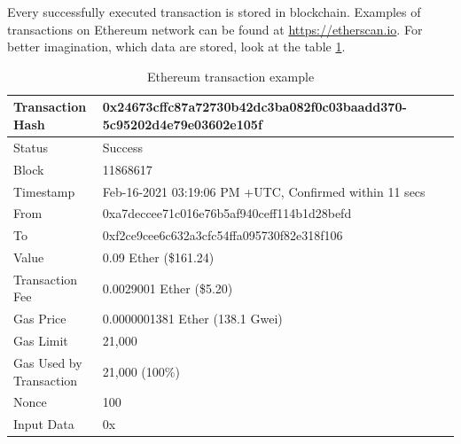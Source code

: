 \documentclass[thesis=M,english]{FITthesis}[2019/12/23]
\begin{document}
Every successfully executed transaction is stored in blockchain. Examples of transactions on Ethereum network can be found at \url{https://etherscan.io}. For better imagination, which data are stored, look at the table \ref{etherscanTransactionTable}.

\begin{table}[ht!]
\caption{Ethereum transaction example \cite{etherscanTransaction} }  \label{EthTransactionExample}
\label{etherscanTransactionTable}
\begin{tabular}{| p{0.2\linewidth} | p{0.8\linewidth} |}
\hline
Transaction Hash        & 0x24673cffc87a72730b42dc3ba082f0c03baadd370- 5c95202d4e79e03602e105f \\\hline
Status                  & Success                                                            \\\hline
Block                   & 11868617                                                           \\\hline
Timestamp               & Feb-16-2021 03:19:06 PM +UTC, Confirmed within 11 secs             \\\hline
From                    & 0xa7deccee71c016e76b5af940ceff114b1d28befd                         \\\hline
To                      & 0xf2ce9cee6c632a3cfc54ffa095730f82e318f106                         \\\hline
Value                   & 0.09 Ether (\$161.24)                                              \\\hline
Transaction Fee         & 0.0029001 Ether (\$5.20)                                           \\\hline
Gas Price               & 0.0000001381 Ether (138.1 Gwei)                                    \\\hline
Gas Limit               & 21,000                                                             \\\hline
Gas Used by Transaction & 21,000 (100\%)                                                     \\\hline
Nonce                   & 100                                                                \\\hline
Input Data              & 0x                                                                 \\\hline
\end{tabular}
\end{table}
\end{document}
